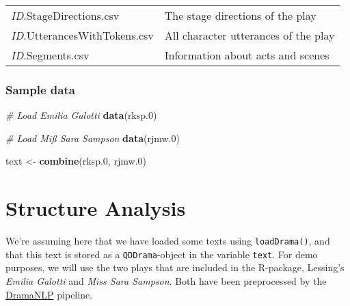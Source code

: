 \documentclass[]{book}
\newenvironment{Shaded}{\begin{snugshade}}{\end{snugshade}}
\newcommand{\CommentTok}[1]{\textcolor[rgb]{0.56,0.35,0.01}{\textit{#1}}}
\newcommand{\FloatTok}[1]{\textcolor[rgb]{0.00,0.00,0.81}{#1}}
\newcommand{\KeywordTok}[1]{\textcolor[rgb]{0.13,0.29,0.53}{\textbf{#1}}}
\newcommand{\NormalTok}[1]{#1}
\newcommand{\StringTok}[1]{\textcolor[rgb]{0.31,0.60,0.02}{#1}}
\begin{document}
\begin{longtable}[]{@{}ll@{}}
\begin{minipage}[t]{0.26\columnwidth}
\emph{ID}.StageDirections.csv\strut
\end{minipage} & \begin{minipage}[t]{0.68\columnwidth}\raggedright
The stage directions of the play\strut
\end{minipage}\tabularnewline
\begin{minipage}[t]{0.26\columnwidth}\raggedright
\emph{ID}.UtterancesWithTokens.csv\strut
\end{minipage} & \begin{minipage}[t]{0.68\columnwidth}\raggedright
All character utterances of the play\strut
\end{minipage}\tabularnewline
\begin{minipage}[t]{0.26\columnwidth}\raggedright
\emph{ID}.Segments.csv\strut
\end{minipage} & \begin{minipage}[t]{0.68\columnwidth}\raggedright
Information about acts and scenes\strut
\end{minipage}\tabularnewline
\bottomrule
\end{longtable}

\hypertarget{sample-data}{%
\section{Sample data}\label{sample-data}}

\begin{Shaded}
\begin{Highlighting}[]
\CommentTok{# Load Emilia Galotti}
\KeywordTok{data}\NormalTok{(rksp}\FloatTok{.0}\NormalTok{)}

\CommentTok{# Load Miß Sara Sampson}
\KeywordTok{data}\NormalTok{(rjmw}\FloatTok{.0}\NormalTok{)}

\NormalTok{text <-}\StringTok{ }\KeywordTok{combine}\NormalTok{(rksp}\FloatTok{.0}\NormalTok{, rjmw}\FloatTok{.0}\NormalTok{)}
\end{Highlighting}
\end{Shaded}

\hypertarget{part-structure-analysis}{%
\part{Structure Analysis}\label{part-structure-analysis}}

We're assuming here that we have loaded some texts using \texttt{loadDrama()}, and that this text is stored as a \texttt{QDDrama}-object in the variable \texttt{text}. For demo purposes, we will use the two plays that are included in the R-package, Lessing's \emph{Emilia Galotti} and \emph{Miss Sara Sampson}. Both have been preprocessed by the \href{https://github.com/quadrama/DramaNLP}{DramaNLP} pipeline.
\end{document}
